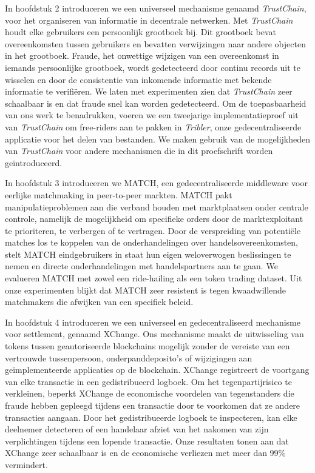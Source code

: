 {In hoofdstuk 2 introduceren we een universeel mechanisme genaamd \emph{TrustChain}, voor het organiseren van informatie in decentrale netwerken.
Met \emph{TrustChain} houdt elke gebruikers een persoonlijk grootboek bij.
Dit grootboek bevat overeenkomsten tussen gebruikers en bevatten verwijzingen naar andere objecten in het grootboek.
Fraude, het onwettige wijzigen van een overeenkomst in iemands persoonlijke grootboek, wordt gedetecteerd door continu records uit te wisselen en door de consistentie van inkomende informatie met bekende informatie te verifiëren.
We laten met experimenten zien dat \emph{TrustChain} zeer schaalbaar is en dat fraude snel kan worden gedetecteerd.
Om de toepasbaarheid van ons werk te benadrukken, voeren we een tweejarige implementatieproef uit van \emph{TrustChain} om free-riders aan te pakken in \emph{Tribler}, onze gedecentraliseerde applicatie voor het delen van bestanden.
We maken gebruik van de mogelijkheden van \emph{TrustChain} voor andere mechanismen die in dit proefschrift worden geïntroduceerd.

In hoofdstuk 3 introduceren we MATCH, een gedecentraliseerde middleware voor eerlijke matchmaking in peer-to-peer markten.
MATCH pakt manipulatieproblemen aan die verband houden met marktplaatsen onder centrale controle, namelijk de mogelijkheid om specifieke orders door de marktexploitant te prioriteren, te verbergen of te vertragen.
Door de verspreiding van potentiële matches los te koppelen van de onderhandelingen over handelsovereenkomsten, stelt MATCH eindgebruikers in staat hun eigen weloverwogen beslissingen te nemen en directe onderhandelingen met handelspartners aan te gaan.
We evalueren MATCH met zowel een ride-hailing als een token trading dataset.
Uit onze experimenten blijkt dat MATCH zeer resistent is tegen kwaadwillende matchmakers die afwijken van een specifiek beleid.

In hoofdstuk 4 introduceren we een universeel en gedecentraliseerd mechanisme voor settlement, genaamd XChange.
Ons mechanisme maakt de uitwisseling van tokens tussen geautoriseerde blockchains mogelijk zonder de vereiste van een vertrouwde tussenpersoon, onderpanddeposito's of wijzigingen aan geïmplementeerde applicaties op de blockchain.
XChange registreert de voortgang van elke transactie in een gedistribueerd logboek.
Om het tegenpartijrisico te verkleinen, beperkt XChange de economische voordelen van tegenstanders die fraude hebben gepleegd tijdens een transactie door te voorkomen dat ze andere transacties aangaan.
Door het gedistribueerde logboek te inspecteren, kan elke deelnemer detecteren of een handelaar afziet van het nakomen van zijn verplichtingen tijdens een lopende transactie.
Onze resultaten tonen aan dat XChange zeer schaalbaar is en de economische verliezen met meer dan 99\% vermindert.

}
